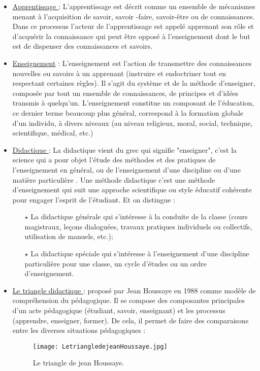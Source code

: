 \begin{itemize}
	\item \underline{Apprentissage }: L’apprentissage est décrit comme un ensemble de mécanismes menant à
	l’acquisition de savoir, savoir -faire, savoir-être ou de connaissances.
	Dans ce processus l’acteur de l’apprentissage est appelé apprenant son rôle et d’acquérir la
	connaissance qui peut être opposé à l’enseignement dont le but est de dispenser des connaissances
	et savoirs. 
	
	
	\item  \underline{ Enseignement} : L’enseignement est l’action de transmettre des connaissances nouvelles ou
	savoirs à un apprenant (instruire et endoctriner tout en respectant certaines règles). Il s’agit du
	système et de la méthode d’enseigner, composée par tout un ensemble de connaissances, de
	principes et d’idées transmis à quelqu’un.
	L’enseignement constitue un composant de l’éducation, ce dernier terme beaucoup plus
	général, correspond à la formation globale d’un individu, à divers niveaux (au niveau religieux, moral,
	social, technique, scientifique, médical, etc.) 	
	\item \underline{ Didactique }: La didactique vient du grec qui signifie "enseigner", c’est la science qui a pour
	objet l’étude des méthodes et des pratiques de l’enseignement en général, ou de l’enseignement
	d’une discipline ou d’une matière particulière .
	Une méthode didactique c’est une méthode d’enseignement qui suit une approche
	scientifique ou style éducatif cohérente pour engager l’esprit de l’étudiant. Et on distingue :
	\begin{itemize}	
	\item[$\star$] La didactique générale qui s’intéresse à la conduite de la classe (cours magistraux,
	leçons dialoguées, travaux pratiques individuels ou collectifs, utilisation de manuels,
	etc.);
	\item[$\star$] La didactique spéciale qui s’intéresse à l’enseignement d’une discipline particulière
	pour une classe, un cycle d’études ou un ordre d’enseignement.
\end{itemize}
	\item \underline{ Le triangle didactique }: proposé par Jean Houssaye en 1988 comme modèle de
	compréhension du pédagogique. Il se compose des composantes principales d’un acte pédagogique
	(étudiant, savoir, enseignant) et les processus (apprendre, enseigner, former). De cela, il permet de faire des comparaisons entre les diverses situations pédagogiques  :
	\begin{figure}[ht]
		\centering
		\texttt{[image: LetriangledejeanHoussaye.jpg]}
		\caption{ Le triangle de jean Houssaye.}
		\label{fig: Le triangle de jean Houssaye}
	\end{figure}
	\FloatBarrier
	

\end{itemize}
